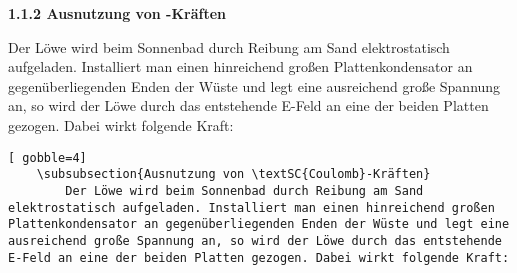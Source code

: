 \documentclass["WS\space 16-17\space -\space LaTeX-Kurs\space -\space Praesentation\space -\space 1.tex"]{subfiles}
\begin{document}
\begin{frame}[fragile]
	\Losung
	\begin{outputbox}
		{ \large\textbf{1.1.2 Ausnutzung von -Kräften}}
		
		Der Löwe wird beim Sonnenbad durch Reibung am Sand elektrostatisch aufgeladen. Installiert man einen hinreichend großen Plattenkondensator an gegenüberliegenden Enden der Wüste und legt eine ausreichend große Spannung an, so wird der Löwe durch das entstehende E-Feld an eine der beiden Platten gezogen. Dabei wirkt folgende Kraft: 
	\end{outputbox}

	\Code
	\begin{lstlisting}[ gobble=4]
	\subsubsection{Ausnutzung von \textSC{Coulomb}-Kräften}
	    Der Löwe wird beim Sonnenbad durch Reibung am Sand elektrostatisch aufgeladen. Installiert man einen hinreichend großen Plattenkondensator an gegenüberliegenden Enden der Wüste und legt eine ausreichend große Spannung an, so wird der Löwe durch das entstehende E-Feld an eine der beiden Platten gezogen. Dabei wirkt folgende Kraft: 
	\end{lstlisting}
\end{frame}
\end{document}
